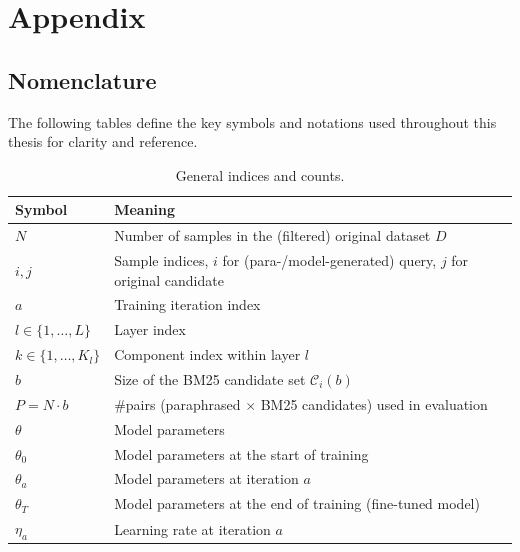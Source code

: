 \chapter{Appendix}
\section{Nomenclature}
The following tables define the key symbols and notations used throughout this thesis for clarity and reference.

\begin{table}[htb!]
    \centering
    \small
    \begin{tabular}{ll}
        \textbf{Symbol} & \textbf{Meaning} \\
        \hline
        $N$ & Number of samples in the (filtered) original dataset $D$ \\
        $i, j$ & Sample indices, $i$ for (para-/model-generated) query, $j$ for original candidate \\
        $a$ & Training iteration index \\
        $l \in \{1,\dots,L\}$ & Layer index \\
        $k \in \{1,\dots,K_l\}$ & Component index within layer $l$ \\
        $b$ & Size of the BM25 candidate set $\mathcal{C}_i(b)$ \\
        $P=N\cdot b$ & \#pairs (paraphrased $\times$ BM25 candidates) used in evaluation \\
        \hline
        $\theta$ & Model parameters \\
        $\theta_0$ & Model parameters at the start of training \\
        $\theta_a$ & Model parameters at iteration $a$ \\
        $\theta_T$ & Model parameters at the end of training (fine-tuned model) \\
        $\eta_a$ & Learning rate at iteration $a$ \\
    \end{tabular}
    \caption{General indices and counts.}
    \label{tab:nomenclature-general}
\end{table}

